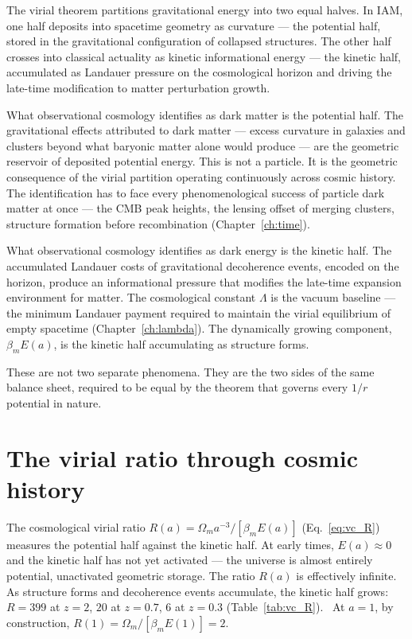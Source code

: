 The virial theorem partitions gravitational energy into two equal halves. In IAM, one half deposits into spacetime geometry as curvature --- the potential
half, stored in the gravitational configuration of collapsed structures. The other half crosses into classical actuality as kinetic informational energy
--- the kinetic half, accumulated as Landauer pressure on the cosmological horizon and driving the late-time modification to matter perturbation growth.

What observational cosmology identifies as dark matter is the potential half. The gravitational effects attributed to dark matter --- excess curvature in
galaxies and clusters beyond what baryonic matter alone would produce --- are the geometric reservoir of deposited potential energy. This is not a particle.
It is the geometric consequence of the virial partition operating continuously across cosmic history. The identification has to face every phenomenological
success of particle dark matter at once --- the CMB peak heights, the lensing offset of merging clusters, structure formation before recombination
(Chapter~\ref{ch:time}).

What observational cosmology identifies as dark energy is the kinetic half. The accumulated Landauer costs of gravitational decoherence events, encoded on
the horizon, produce an informational pressure that modifies the late-time expansion environment for matter. The cosmological constant $\Lambda$ is the
vacuum baseline --- the minimum Landauer payment required to maintain the virial equilibrium of empty spacetime (Chapter~\ref{ch:lambda}). The dynamically
growing component, $\beta_mE(a)$, is the kinetic half accumulating as structure forms.

These are not two separate phenomena. They are the two sides of the same balance sheet, required to be equal by the theorem that governs every $1/r$
potential in nature.

\section{The virial ratio through cosmic history}\label{sec:vp_ratio}
The cosmological virial ratio $R(a)=\Omega_ma^{-3}/[\beta_mE(a)]$ (Eq.~\eqref{eq:vc_R}) measures the potential half against the kinetic half. At early
times, $E(a)\approx0$ and the kinetic half has not yet activated --- the universe is almost entirely potential, unactivated geometric storage. The ratio
$R(a)$ is effectively infinite. As structure forms and decoherence events accumulate, the kinetic half grows: $R=399$ at $z=2$, $20$ at $z=0.7$, $6$ at
$z=0.3$ (Table~\ref{tab:vc_R}). \calc\ At $a=1$, by construction, $R(1)=\Omega_m/[\beta_mE(1)]=2$.

